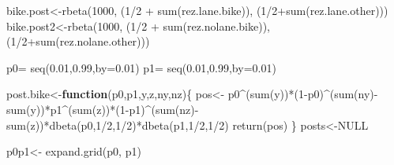 \documentclass[
]{book}
\newenvironment{Shaded}{\begin{snugshade}}{\end{snugshade}}
\newcommand{\AttributeTok}[1]{\textcolor[rgb]{0.77,0.63,0.00}{#1}}
\newcommand{\ConstantTok}[1]{\textcolor[rgb]{0.00,0.00,0.00}{#1}}
\newcommand{\ControlFlowTok}[1]{\textcolor[rgb]{0.13,0.29,0.53}{\textbf{#1}}}
\newcommand{\DecValTok}[1]{\textcolor[rgb]{0.00,0.00,0.81}{#1}}
\newcommand{\FloatTok}[1]{\textcolor[rgb]{0.00,0.00,0.81}{#1}}
\newcommand{\FunctionTok}[1]{\textcolor[rgb]{0.00,0.00,0.00}{#1}}
\newcommand{\NormalTok}[1]{#1}
\newcommand{\OtherTok}[1]{\textcolor[rgb]{0.56,0.35,0.01}{#1}}
\newcommand{\SpecialCharTok}[1]{\textcolor[rgb]{0.00,0.00,0.00}{#1}}
\theoremstyle{definition}
\theoremstyle{definition}
\theoremstyle{definition}
\theoremstyle{definition}
\theoremstyle{remark}
\begin{document}
\begin{Shaded}
\begin{Highlighting}[]
\NormalTok{bike.post}\OtherTok{\textless{}{-}}\FunctionTok{rbeta}\NormalTok{(}\DecValTok{1000}\NormalTok{, (}\DecValTok{1}\SpecialCharTok{/}\DecValTok{2} \SpecialCharTok{+} \FunctionTok{sum}\NormalTok{(rez.lane.bike)), (}\DecValTok{1}\SpecialCharTok{/}\DecValTok{2}\SpecialCharTok{+}\FunctionTok{sum}\NormalTok{(rez.lane.other)))}
\NormalTok{bike.post2}\OtherTok{\textless{}{-}}\FunctionTok{rbeta}\NormalTok{(}\DecValTok{1000}\NormalTok{, (}\DecValTok{1}\SpecialCharTok{/}\DecValTok{2} \SpecialCharTok{+} \FunctionTok{sum}\NormalTok{(rez.nolane.bike)), (}\DecValTok{1}\SpecialCharTok{/}\DecValTok{2}\SpecialCharTok{+}\FunctionTok{sum}\NormalTok{(rez.nolane.other)))}



\NormalTok{p0}\OtherTok{=} \FunctionTok{seq}\NormalTok{(}\FloatTok{0.01}\NormalTok{,}\FloatTok{0.99}\NormalTok{,}\AttributeTok{by=}\FloatTok{0.01}\NormalTok{)}
\NormalTok{p1}\OtherTok{=} \FunctionTok{seq}\NormalTok{(}\FloatTok{0.01}\NormalTok{,}\FloatTok{0.99}\NormalTok{,}\AttributeTok{by=}\FloatTok{0.01}\NormalTok{)}


\NormalTok{post.bike}\OtherTok{\textless{}{-}}\ControlFlowTok{function}\NormalTok{(p0,p1,y,z,ny,nz)\{}
\NormalTok{  pos}\OtherTok{\textless{}{-}}\NormalTok{ p0}\SpecialCharTok{\^{}}\NormalTok{(}\FunctionTok{sum}\NormalTok{(y))}\SpecialCharTok{*}\NormalTok{(}\DecValTok{1}\SpecialCharTok{{-}}\NormalTok{p0)}\SpecialCharTok{\^{}}\NormalTok{(}\FunctionTok{sum}\NormalTok{(ny)}\SpecialCharTok{{-}}\FunctionTok{sum}\NormalTok{(y))}\SpecialCharTok{*}\NormalTok{p1}\SpecialCharTok{\^{}}\NormalTok{(}\FunctionTok{sum}\NormalTok{(z))}\SpecialCharTok{*}\NormalTok{(}\DecValTok{1}\SpecialCharTok{{-}}\NormalTok{p1)}\SpecialCharTok{\^{}}\NormalTok{(}\FunctionTok{sum}\NormalTok{(nz)}\SpecialCharTok{{-}}\FunctionTok{sum}\NormalTok{(z))}\SpecialCharTok{*}\FunctionTok{dbeta}\NormalTok{(p0,}\DecValTok{1}\SpecialCharTok{/}\DecValTok{2}\NormalTok{,}\DecValTok{1}\SpecialCharTok{/}\DecValTok{2}\NormalTok{)}\SpecialCharTok{*}\FunctionTok{dbeta}\NormalTok{(p1,}\DecValTok{1}\SpecialCharTok{/}\DecValTok{2}\NormalTok{,}\DecValTok{1}\SpecialCharTok{/}\DecValTok{2}\NormalTok{)}
  \FunctionTok{return}\NormalTok{(pos)}
\NormalTok{\}}
\NormalTok{ posts}\OtherTok{\textless{}{-}}\ConstantTok{NULL}
 
\NormalTok{p0p1}\OtherTok{\textless{}{-}} \FunctionTok{expand.grid}\NormalTok{(p0, p1)}


\end{Highlighting}
\end{Shaded}
\end{document}
